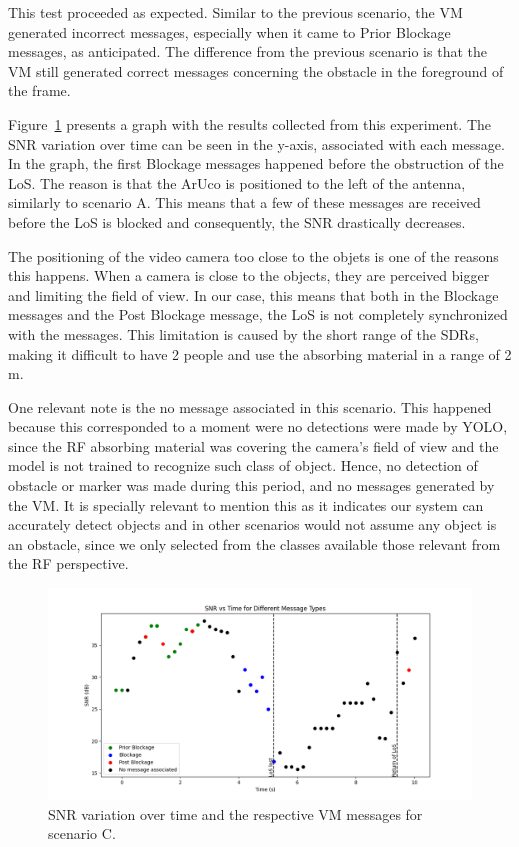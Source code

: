 This test proceeded as expected.
Similar to the previous scenario, the VM generated incorrect messages, especially when it came to Prior Blockage messages, as anticipated.
The difference from the previous scenario is that the VM still generated correct messages concerning the obstacle in the foreground of the frame.

Figure~\ref{fig:results_2} presents a graph with the results collected from this experiment.
The SNR variation over time can be seen in the y-axis, associated with each message.
In the graph, the first Blockage messages happened before the obstruction of the LoS\@.
The reason is that the ArUco is positioned to the left of the antenna, similarly to scenario A\@.
This means that a few of these messages are received before the LoS is blocked and consequently, the SNR drastically decreases.

The positioning of the video camera too close to the objets is one of the reasons this happens.
When a camera is close to the objects, they are perceived bigger and limiting the field of view.
In our case, this means that both in the Blockage messages and the Post Blockage message, the LoS is not completely synchronized with the messages.
This limitation is caused by the short range of the SDRs, making it difficult to have 2 people and use the absorbing material in a range of 2 m.

One relevant note is the no message associated in this scenario.
This happened because this corresponded to a moment were no detections were made by YOLO, since the RF absorbing material was covering the camera's field of view and the model is not trained to recognize such class of object.
Hence, no detection of obstacle or marker was made during this period, and no messages generated by the VM\@.
It is specially relevant to mention this as it indicates our system can accurately detect objects and in other scenarios would not assume any object is an obstacle, since we only selected from the classes available those relevant from the RF perspective.

\begin{figure}[H]
    \centering
    \includegraphics[width=\linewidth]{figures/results_2}
    \caption{SNR variation over time and the respective VM messages for scenario C.}
    \label{fig:results_2}
\end{figure}

